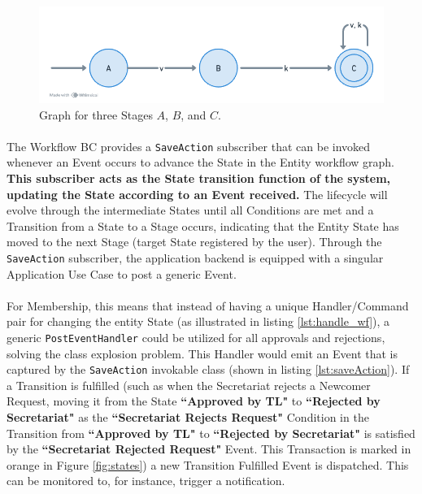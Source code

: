 \begin{figure} [H]
    \centering
    \includegraphics[width=1\linewidth]{figuras/abc_graph_simple.png}
    \caption{Graph for three Stages $A$, $B$, and $C$.}
    \label{fig:abc_graph_simple}
\end{figure}

\paragraph{} The Workflow BC provides a \verb|SaveAction| subscriber that can be invoked whenever an Event occurs to advance the State in the Entity workflow graph. \textbf{This subscriber acts as the State transition function of the system, updating the State according to an Event received.} The lifecycle will evolve through the intermediate States until all Conditions are met and a Transition from a State to a Stage occurs, indicating that the Entity State has moved to the next Stage (target State registered by the user). Through the \verb|SaveAction| subscriber, the application backend is equipped with a singular Application Use Case to post a generic Event.

\paragraph{} For Membership, this means that instead of having a unique Handler/Command pair for changing the entity State (as illustrated in listing \ref{lst:handle_wf}), a generic \verb|PostEventHandler| could be utilized for all approvals and rejections, solving the class explosion problem. This Handler would emit an Event that is captured by the \verb|SaveAction| invokable class (shown in listing \ref{lst:saveAction}). If a Transition is fulfilled (such as when the Secretariat rejects a Newcomer Request, moving it from the State \textbf{``Approved by TL"} to \textbf{``Rejected by Secretariat"} as the \textbf{``Secretariat Rejects Request"} Condition in the Transition from \textbf{``Approved by TL"} to \textbf{``Rejected by Secretariat"} is satisfied by the \textbf{``Secretariat Rejected Request"} Event. This Transaction is marked in orange in Figure \ref{fig:states}) a new Transition Fulfilled Event is dispatched. This can be monitored to, for instance, trigger a notification.

